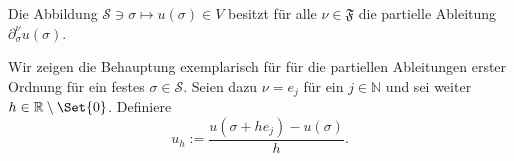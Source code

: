 \begin{Satz}
\label{satz:ps:rg:existenz_partieller_ableitungen}
    Die Abbildung $\mathcal S \ni \sigma \mapsto u(\sigma) \in V$ besitzt für alle $\nu \in \mathfrak F$ die partielle Ableitung $\partial^{\nu}_{\sigma} u(\sigma)$.


    \begin{Beweis}
        Wir zeigen die Behauptung exemplarisch für für die partiellen Ableitungen erster Ordnung für ein festes $\sigma \in \mathcal S$.
        Seien dazu $\nu = e_{j}$ für ein $j \in \mathbb{N}$ und sei weiter $h \in \mathbb{R} \setminus \Set{ 0 }$.
        Definiere
        \begin{equation}
            u_{h} := \frac{u(\sigma + h e_{j}) - u(\sigma)}{h}.
        \end{equation}


\end{Beweis}
\end{Satz}
